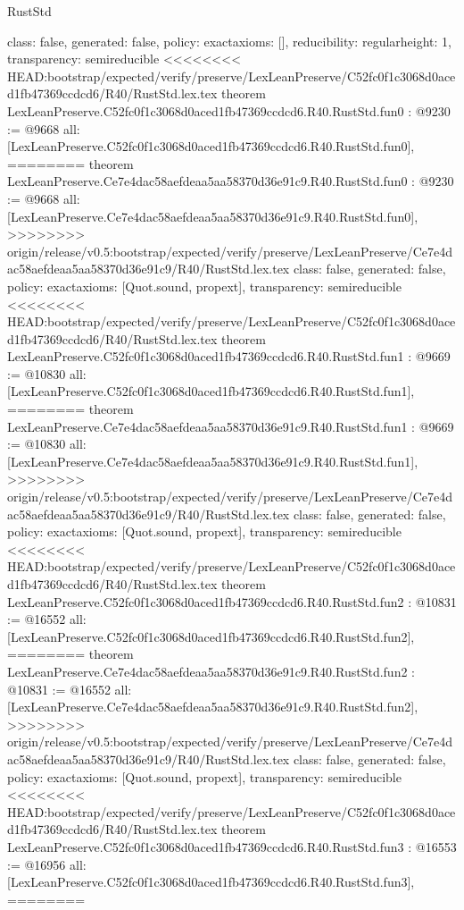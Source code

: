 \begin{lexlean}{RustStd}
\begin{coremodule}
{\begin{coremodule}
{{{  class: false,
  generated: false,
  policy: exact{axioms: []},
  reducibility: regular{height: 1},
  transparency: semireducible
}
<<<<<<<< HEAD:bootstrap/expected/verify/preserve/LexLeanPreserve/C52fc0f1c3068d0aced1fb47369ccdcd6/R40/RustStd.lex.tex
theorem LexLeanPreserve.C52fc0f1c3068d0aced1fb47369ccdcd6.R40.RustStd.fun0 : @9230 := @9668 {
  all: [LexLeanPreserve.C52fc0f1c3068d0aced1fb47369ccdcd6.R40.RustStd.fun0],
========
theorem LexLeanPreserve.Ce7e4dac58aefdeaa5aa58370d36e91c9.R40.RustStd.fun0 : @9230 := @9668 {
  all: [LexLeanPreserve.Ce7e4dac58aefdeaa5aa58370d36e91c9.R40.RustStd.fun0],
>>>>>>>> origin/release/v0.5:bootstrap/expected/verify/preserve/LexLeanPreserve/Ce7e4dac58aefdeaa5aa58370d36e91c9/R40/RustStd.lex.tex
  class: false,
  generated: false,
  policy: exact{axioms: [Quot.sound, propext]},
  transparency: semireducible
}
<<<<<<<< HEAD:bootstrap/expected/verify/preserve/LexLeanPreserve/C52fc0f1c3068d0aced1fb47369ccdcd6/R40/RustStd.lex.tex
theorem LexLeanPreserve.C52fc0f1c3068d0aced1fb47369ccdcd6.R40.RustStd.fun1 : @9669 := @10830 {
  all: [LexLeanPreserve.C52fc0f1c3068d0aced1fb47369ccdcd6.R40.RustStd.fun1],
========
theorem LexLeanPreserve.Ce7e4dac58aefdeaa5aa58370d36e91c9.R40.RustStd.fun1 : @9669 := @10830 {
  all: [LexLeanPreserve.Ce7e4dac58aefdeaa5aa58370d36e91c9.R40.RustStd.fun1],
>>>>>>>> origin/release/v0.5:bootstrap/expected/verify/preserve/LexLeanPreserve/Ce7e4dac58aefdeaa5aa58370d36e91c9/R40/RustStd.lex.tex
  class: false,
  generated: false,
  policy: exact{axioms: [Quot.sound, propext]},
  transparency: semireducible
}
<<<<<<<< HEAD:bootstrap/expected/verify/preserve/LexLeanPreserve/C52fc0f1c3068d0aced1fb47369ccdcd6/R40/RustStd.lex.tex
theorem LexLeanPreserve.C52fc0f1c3068d0aced1fb47369ccdcd6.R40.RustStd.fun2 : @10831 := @16552 {
  all: [LexLeanPreserve.C52fc0f1c3068d0aced1fb47369ccdcd6.R40.RustStd.fun2],
========
theorem LexLeanPreserve.Ce7e4dac58aefdeaa5aa58370d36e91c9.R40.RustStd.fun2 : @10831 := @16552 {
  all: [LexLeanPreserve.Ce7e4dac58aefdeaa5aa58370d36e91c9.R40.RustStd.fun2],
>>>>>>>> origin/release/v0.5:bootstrap/expected/verify/preserve/LexLeanPreserve/Ce7e4dac58aefdeaa5aa58370d36e91c9/R40/RustStd.lex.tex
  class: false,
  generated: false,
  policy: exact{axioms: [Quot.sound, propext]},
  transparency: semireducible
}
<<<<<<<< HEAD:bootstrap/expected/verify/preserve/LexLeanPreserve/C52fc0f1c3068d0aced1fb47369ccdcd6/R40/RustStd.lex.tex
theorem LexLeanPreserve.C52fc0f1c3068d0aced1fb47369ccdcd6.R40.RustStd.fun3 : @16553 := @16956 {
  all: [LexLeanPreserve.C52fc0f1c3068d0aced1fb47369ccdcd6.R40.RustStd.fun3],
========
}}}}}}
\end{coremodule}}
\end{coremodule}
\end{lexlean}
